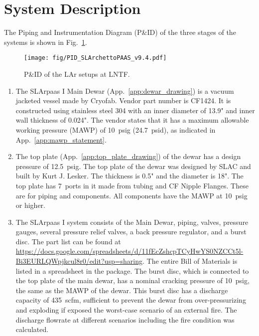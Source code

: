 \section{System Description}
\label{sec:system}

The Piping and Instrumentation Diagram (P\&ID) of the three stages
of the systems is shown in Fig.~\ref{fig:PID}.

\begin{figure}[h]
    \centering
    \texttt{[image: fig/PID\_SLArchettoPAAS\_v9.4.pdf]}
    \caption{P\&ID of the LAr setups at LNTF.}
    \label{fig:PID}
\end{figure}

\begin{enumerate}
    \item The SLArpaas I Main Dewar (App.~\ref{app:dewar_drawing}) is a vacuum jacketed 
    vessel made by Cryofab. Vendor part number is CF1424.
    It is constructed using stainless steel 304 with an inner diameter of 13.9" 
    and inner wall thickness of 0.024". 
    The vendor states that it has a maximum allowable working pressure (MAWP) 
    of 10~psig (24.7~psid), as indicated in App.~\ref{app:mawp_statement}.
    \item The top plate (App.~\ref{app:top_plate_drawing}) of the dewar has a design 
    pressure of 12.5~psig. 
    The top plate of the dewar was designed by SLAC and built by Kurt J. Lesker.
    The thickness is 0.5" and the diameter is 18". 
    The top plate has 7~ports in it made from tubing and CF Nipple Flanges. 
    These are for piping and components. All components have the MAWP at 10~psig or higher.
    \item The SLArpaas I system consists of the Main Dewar, piping, valves, pressure gauges, 
    several pressure relief valves, a back pressure regulator, and a burst disc. 
    The part list can be found at 
    \url{https://docs.google.com/spreadsheets/d/11fEcZshcpTCyHwYS0NZCCt5l-Bi3EURLQWpjkcul8r0/edit?usp=sharing}. 
    The entire Bill of Materials is listed in a spreadsheet in the package. 
    The burst disc, which is connected to the top plate of the main dewar, 
    has a nominal cracking pressure of 10~psig, the same as the MAWP of the dewar. 
    This burst disc has a discharge capacity of 435~scfm, sufficient to prevent the dewar 
    from over-pressurizing and exploding if exposed the worst-case scenario of an external fire. 
    The discharge flowrate at different scenarios including the fire condition was calculated. 

\end{enumerate}
